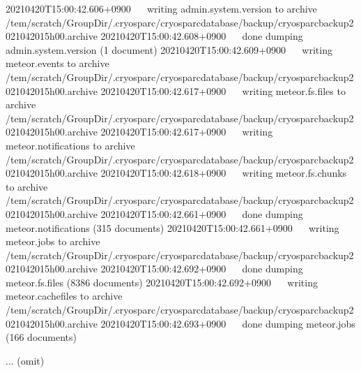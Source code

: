 \documentclass[a4paper,10pt,english]{sphinxmanual}
\begin{document}
\begin{sphinxVerbatim}[commandchars=\\\{\}]
2021\PYGZhy{}04\PYGZhy{}20T15:00:42.606+0900    writing admin.system.version to archive \PYGZsq{}/tem/scratch/\PYGZlt{}GroupDir\PYGZgt{}/.cryosparc/cryosparc\PYGZus{}database/backup/cryosparc\PYGZus{}backup\PYGZus{}2021\PYGZus{}04\PYGZus{}20\PYGZus{}15h00.archive\PYGZsq{}
2021\PYGZhy{}04\PYGZhy{}20T15:00:42.608+0900    done dumping admin.system.version (1 document)
2021\PYGZhy{}04\PYGZhy{}20T15:00:42.609+0900    writing meteor.events to archive \PYGZsq{}/tem/scratch/\PYGZlt{}GroupDir\PYGZgt{}/.cryosparc/cryosparc\PYGZus{}database/backup/cryosparc\PYGZus{}backup\PYGZus{}2021\PYGZus{}04\PYGZus{}20\PYGZus{}15h00.archive\PYGZsq{}
2021\PYGZhy{}04\PYGZhy{}20T15:00:42.617+0900    writing meteor.fs.files to archive \PYGZsq{}/tem/scratch/\PYGZlt{}GroupDir\PYGZgt{}/.cryosparc/cryosparc\PYGZus{}database/backup/cryosparc\PYGZus{}backup\PYGZus{}2021\PYGZus{}04\PYGZus{}20\PYGZus{}15h00.archive\PYGZsq{}
2021\PYGZhy{}04\PYGZhy{}20T15:00:42.617+0900    writing meteor.notifications to archive \PYGZsq{}/tem/scratch/\PYGZlt{}GroupDir\PYGZgt{}/.cryosparc/cryosparc\PYGZus{}database/backup/cryosparc\PYGZus{}backup\PYGZus{}2021\PYGZus{}04\PYGZus{}20\PYGZus{}15h00.archive\PYGZsq{}
2021\PYGZhy{}04\PYGZhy{}20T15:00:42.618+0900    writing meteor.fs.chunks to archive \PYGZsq{}/tem/scratch/\PYGZlt{}GroupDir\PYGZgt{}/.cryosparc/cryosparc\PYGZus{}database/backup/cryosparc\PYGZus{}backup\PYGZus{}2021\PYGZus{}04\PYGZus{}20\PYGZus{}15h00.archive\PYGZsq{}
2021\PYGZhy{}04\PYGZhy{}20T15:00:42.661+0900    done dumping meteor.notifications (315 documents)
2021\PYGZhy{}04\PYGZhy{}20T15:00:42.661+0900    writing meteor.jobs to archive \PYGZsq{}/tem/scratch/\PYGZlt{}GroupDir\PYGZgt{}/.cryosparc/cryosparc\PYGZus{}database/backup/cryosparc\PYGZus{}backup\PYGZus{}2021\PYGZus{}04\PYGZus{}20\PYGZus{}15h00.archive\PYGZsq{}
2021\PYGZhy{}04\PYGZhy{}20T15:00:42.692+0900    done dumping meteor.fs.files (8386 documents)
2021\PYGZhy{}04\PYGZhy{}20T15:00:42.692+0900    writing meteor.cache\PYGZus{}files to archive \PYGZsq{}/tem/scratch/\PYGZlt{}GroupDir\PYGZgt{}/.cryosparc/cryosparc\PYGZus{}database/backup/cryosparc\PYGZus{}backup\PYGZus{}2021\PYGZus{}04\PYGZus{}20\PYGZus{}15h00.archive\PYGZsq{}
2021\PYGZhy{}04\PYGZhy{}20T15:00:42.693+0900    done dumping meteor.jobs (166 documents)

... (omit)


\end{sphinxVerbatim}
\end{document}
